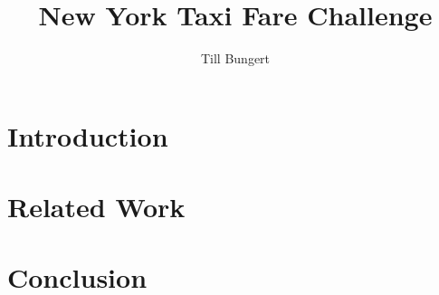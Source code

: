 \documentclass{article}
\title{New York Taxi Fare Challenge}
\author{Till Bungert}
\begin{document}
\maketitle

\begin{abstract}
\end{abstract}

\section{Introduction}%
\label{sec:introduction}


\section{Related Work}%
\label{sec:related_work}





\section{Conclusion}%
\label{sec:conclusion}
    

\printbibliography
\end{document}
